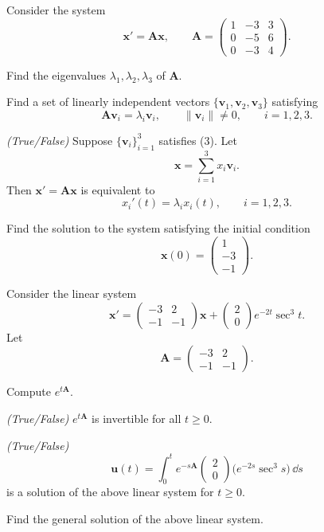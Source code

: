 \begin{problem}
Consider the system
\[
\mathbf x'=\mathbf A\mathbf x,
\qquad
\mathbf A=
\begin{pmatrix}
1&-3&3\\
0&-5&6\\
0&-3&4
\end{pmatrix}.
\]
\begin{problemsubparts}
\item Find the eigenvalues $\lambda_1,\lambda_2,\lambda_3$ of $\mathbf A$.
\item Find a set of linearly independent vectors $\{\mathbf v_1,\mathbf v_2,\mathbf v_3\}$ satisfying
\[
\mathbf A\mathbf v_i=\lambda_i\mathbf v_i,
\qquad
\|\mathbf v_i\|\ne0,
\qquad i=1,2,3. \tag{3}
\]
\item \textit{(True/False)} Suppose $\{\mathbf v_i\}_{i=1}^3$ satisfies (3). Let
\[
\mathbf x=\sum_{i=1}^3x_i\mathbf v_i.
\]
Then $\mathbf x'=\mathbf A\mathbf x$ is equivalent to
\[
x_i'(t)=\lambda_i x_i(t),
\qquad i=1,2,3.
\]
\item Find the solution to the system satisfying the initial condition
\[
\mathbf x(0)=
\begin{pmatrix}
1\\
-3\\
-1
\end{pmatrix}.
\]
\end{problemsubparts}
\end{problem}

\begin{problem}
Consider the linear system
\[
\mathbf x'=
\begin{pmatrix}
-3&2\\
-1&-1
\end{pmatrix}\mathbf x
+
\begin{pmatrix}
2\\
0
\end{pmatrix}e^{-2t}\sec^3t.
\]
Let
\[
\mathbf A=
\begin{pmatrix}
-3&2\\
-1&-1
\end{pmatrix}.
\]
\begin{problemsubparts}
\item Compute $e^{t\mathbf A}$.
\item \textit{(True/False)} $e^{t\mathbf A}$ is invertible for all $t\ge0$.
\item \textit{(True/False)}
\[
\mathbf u(t)=\int_0^t e^{-s\mathbf A}
\begin{pmatrix}
2\\
0
\end{pmatrix}
\bigl(e^{-2s}\sec^3s\bigr)\,\dd s
\]
is a solution of the above linear system for $t\ge0$.
\item Find the general solution of the above linear system.
\end{problemsubparts}
\end{problem}

